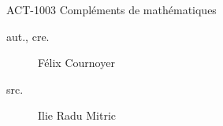 \begin{contrib}{ACT-1003\: Compléments de mathématiques}
\begin{description}
	\item[aut., cre.] Félix Cournoyer
	\item[src.] Ilie Radu Mitric
\end{description}
\end{contrib}